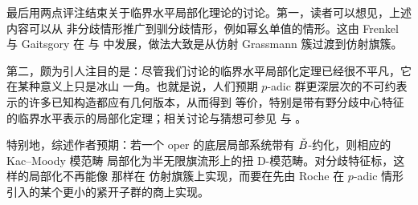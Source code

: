 \ssszh 最后用两点评注结束关于临界水平局部化理论的讨论。第一，读者可以想见，上述内容可以从
非分歧情形推广到驯分歧情形，例如幂幺单值的情形。这由 Frenkel 与 Gaitsgory 在 \cite{fg06loc} 与
\cite{fglocaff} 中发展，做法大致是从仿射 Grassmann 簇过渡到仿射旗簇。

第二，颇为引人注目的是：尽管我们讨论的临界水平局部化定理已经很不平凡，它在某种意义上只是冰山
一角。也就是说，人们预期 $p$-adic 群更深层次的不可约表示的许多已知构造都应有几何版本，从而得到
等价，特别是带有野分歧中心特征的临界水平表示的局部化定理；相关讨论与猜想可参见 \cite{fg06loc} 与
\cite{kamgarpourschedler}。

特别地，综述作者预期：若一个 oper 的底层局部系统带有 $\check{B}$-约化，则相应的 Kac--Moody 模范畴
局部化为半无限旗流形上的扭 D-模范畴。对分歧特征标，这样的局部化不再能像 \cite{fglocaff} 那样在
仿射旗簇上实现，而要在先由 Roche \cite{roche} 在 $p$-adic 情形引入的某个更小的紧开子群的商上实现。
